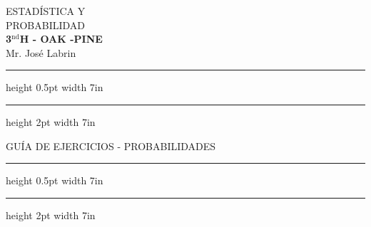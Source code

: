 \documentclass[letterpaper,11pt,spanish]{article}
\begin{document}
\sffamily
\sloppy 
\thispagestyle{empty} 

\begin{minipage}{3.4cm}

\end{minipage}
\begin{minipage}{3.8cm}
{\large ESTADÍSTICA Y \\PROBABILIDAD}\\
\textbf{ 3$^{\text{nd}}$H - OAK -PINE }\\
{Mr. José Labrin}\\
\end{minipage}
\begin{minipage}{9.8cm}
\begin{large}
\end{large}
\end{minipage}


\hrule height 0.5pt width 7in\vskip 3pt
\hrule height 2pt width 7in
\begin{center}
{\huge GUÍA DE EJERCICIOS - PROBABILIDADES}\\
\end{center}
\hrule height 0.5pt width 7in\vskip 3pt
\hrule height 2pt width 7in 

\bigskip
\end{document}
